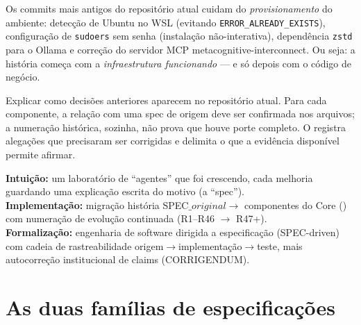 \begin{descricao}
Os commits mais antigos do repositório atual cuidam do \emph{provisionamento} do
ambiente: detecção de Ubuntu no WSL (evitando \texttt{ERROR\_ALREADY\_EXISTS}),
configuração de \texttt{sudoers} sem senha (instalação não-interativa), dependência
\texttt{zstd} para o Ollama e correção do servidor MCP metacognitive-interconnect.
Ou seja: a história começa com a \emph{infraestrutura funcionando} — e só depois
com o código de negócio.
\end{descricao}

\begin{funcao}
Explicar como decisões anteriores aparecem no repositório atual. Para cada
componente, a relação com uma spec de origem deve ser confirmada nos arquivos; a
numeração histórica, sozinha, não prova que houve porte completo. O
 registra alegações que precisaram ser corrigidas e delimita
o que a evidência disponível permite afirmar.
\end{funcao}

\begin{niveis}
\textbf{Intuição:} um laboratório de ``agentes'' que foi crescendo, cada melhoria
guardando uma explicação escrita do motivo (a ``spec'').\\
\textbf{Implementação:} migração história SPEC$\_{original} \to$ componentes do Core
()
com numeração de evolução continuada (R1--R46 $\to$ R47+).\\
\textbf{Formalização:} engenharia de software dirigida a especificação (SPEC-driven) com
cadeia de rastreabilidade origem$\to$implementação$\to$teste, mais autocorreção
institucional de claims (CORRIGENDUM).
\end{niveis}

\section{As duas famílias de especificações}

